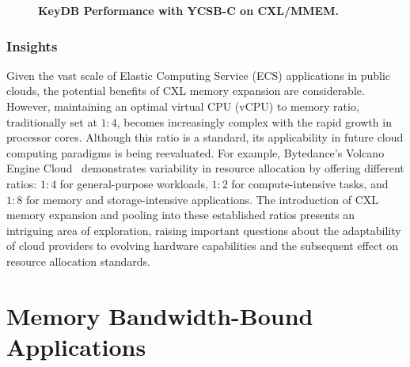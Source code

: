 \begin{figure}[t]
  \center
\caption[KeyDB Performance with YCSB-C on CXL/MMEM]{\textbf{KeyDB Performance with YCSB-C on CXL/MMEM.}}
\end{figure}


\subsubsection{Insights}
Given the vast scale of Elastic Computing Service (ECS) applications in public clouds, the potential benefits of CXL memory expansion are considerable. However, maintaining an optimal virtual CPU (vCPU) to memory ratio, traditionally set at $1:4$, becomes increasingly complex with the rapid growth in processor cores. Although this ratio is a standard, its applicability in future cloud computing paradigms is being reevaluated. For example, Bytedance's Volcano Engine Cloud~\cite{volcano} demonstrates variability in resource allocation by offering different ratios: $1:4$ for general-purpose workloads, $1:2$ for compute-intensive tasks, and $1:8$ for memory and storage-intensive applications. The introduction of CXL memory expansion and pooling into these established ratios presents an intriguing area of exploration, raising important questions about the adaptability of cloud providers to evolving hardware capabilities and the subsequent effect on resource allocation standards.

\section{Memory Bandwidth-Bound Applications}
\label{sec:bandwidth}

